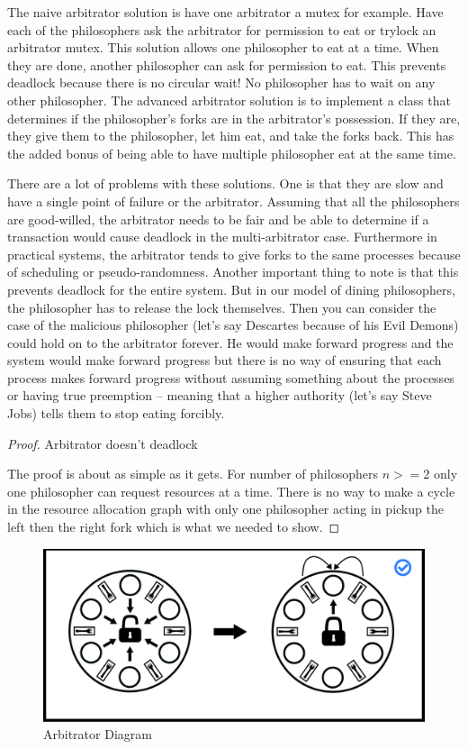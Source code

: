 The naive arbitrator solution is have one arbitrator a mutex for example.
Have each of the philosophers ask the arbitrator for permission to eat or trylock an arbitrator mutex.
This solution allows one philosopher to eat at a time.
When they are done, another philosopher can ask for permission to eat.
This prevents deadlock because there is no circular wait! No philosopher has to wait on any other philosopher.
The advanced arbitrator solution is to implement a class that determines if the philosopher's forks are in the arbitrator's possession.
If they are, they give them to the philosopher, let him eat, and take the forks back.
This has the added bonus of being able to have multiple philosopher eat at the same time.

There are a lot of problems with these solutions.
One is that they are slow and have a single point of failure or the arbitrator.
Assuming that all the philosophers are good-willed, the arbitrator needs to be fair and be able to determine if a transaction would cause deadlock in the multi-arbitrator case.
Furthermore in practical systems, the arbitrator tends to give forks to the same processes because of scheduling or pseudo-randomness.
Another important thing to note is that this prevents deadlock for the entire system.
But in our model of dining philosophers, the philosopher has to release the lock themselves.
Then you can consider the case of the malicious philosopher (let's say Descartes because of his Evil Demons) could hold on to the arbitrator forever.
He would make forward progress and the system would make forward progress but there is no way of ensuring that each process makes forward progress without assuming something about the processes or having true preemption -- meaning that a higher authority (let's say Steve Jobs) tells them to stop eating forcibly.


\begin{proof} Arbitrator doesn't deadlock

The proof is about as simple as it gets. For number of philosophers $n >= 2$ only one philosopher can request resources at a time. There is no way to make a cycle in the resource allocation graph with only one philosopher acting in pickup the left then the right fork which is what we needed to show.

\end{proof}

\begin{figure}[H]
\centering
\includegraphics[width=.9\textwidth]{deadlock/drawings/dining_arbitrator.eps}
\caption{Arbitrator Diagram}
\end{figure}

